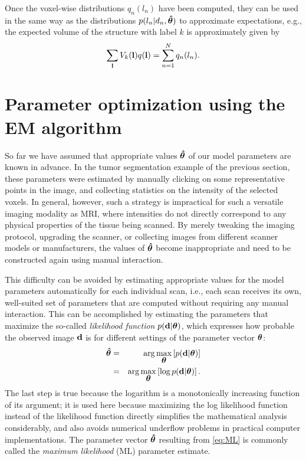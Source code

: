 \documentclass[10pt,twoside]{book}
\begin{document}
Once the voxel-wise distributions $q_n(l_n)$ have been computed, they can be used in the same way as the distributions $p( l_n | d_n, {\mbox{\boldmath {${\hat{\theta}}$}}})$ to approximate expectations, e.g., the expected volume of the structure with label $k$ is approximately given by
\begin{equation}
 \sum_{\mathbf{l}} V_k( \mathbf{l} )  q(\mathbf{l}) = \sum_{n=1}^N q_n(l_n).
\end{equation}


\section{Parameter optimization using the EM algorithm}
\label{sec:EM}

So far we have assumed that appropriate values ${\mbox{\boldmath {${\hat{\theta}}$}}}$ of our model parameters are known in advance.  
In the tumor segmentation example of the previous section, these parameters were estimated by manually clicking 
on some representative points in the image, and collecting statistics on the intensity of the selected voxels. In
general, however, such a strategy is impractical for such a versatile imaging modality as MRI, where intensities
do not directly correspond to any physical properties of the tissue being scanned. By merely tweaking the imaging protocol,
upgrading the scanner, or collecting images from different scanner models or manufacturers, the values of ${\mbox{\boldmath {${\hat{\theta}}$}}}$
become inappropriate and need to be constructed again using manual interaction.

This difficulty can be avoided by estimating appropriate values for the model parameters automatically for each
individual scan, i.e., each scan receives its own, well-suited set of parameters that are computed without requiring any manual
interaction. This can be accomplished by estimating the parameters that maximize the so-called \emph{likelihood function} 
$p(\mathbf{d} | {\mbox{\boldmath {${\theta}$}}})$, which expresses how probable the observed image $\mathbf{d}$ is for different settings of the parameter
vector ${\mbox{\boldmath {${\theta}$}}}$:
\begin{eqnarray}
  {\mbox{\boldmath {${\hat{\theta}}$}}} & = & \arg\max_{{\mbox{\boldmath {${\theta}$}}}} \left[ p( \mathbf{d} | {\mbox{\boldmath {${\theta}$}}} ) \right] \nonumber \\
                       & = & \arg\max_{{\mbox{\boldmath {${\theta}$}}}} \left[ \log p( \mathbf{d} | {\mbox{\boldmath {${\theta}$}}} ) \right] \label{eq:ML}.
\end{eqnarray}
The last step is true because the logarithm is a monotonically increasing function of its argument; it is used here because
maximizing the log likelihood function instead of the likelihood function directly simplifies the mathematical analysis considerably,
and also avoids numerical underflow problems in practical computer implementations.
The parameter vector ${\mbox{\boldmath {${\hat{\theta}}$}}}$ resulting from \eqref{eq:ML} is commonly called the \emph{maximum likelihood} (ML) 
parameter estimate.
\end{document}
